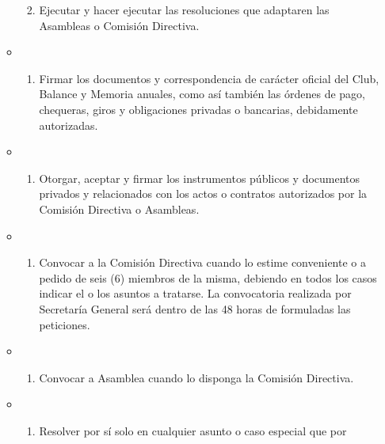 \documentclass[]{book}
\providecommand{\tightlist}{%
  \setlength{\itemsep}{0pt}\setlength{\parskip}{0pt}}
\begin{document}
\begin{itemize}
\begin{itemize}
    \begin{enumerate}
    \def\labelenumi{\alph{enumi})}
    \setcounter{enumi}{4}
    \tightlist
    \item
      Ejecutar y hacer ejecutar las resoluciones que adaptaren las
      Asambleas o Comisión Directiva.
    \end{enumerate}
  \item
    \begin{enumerate}
    \def\labelenumi{\alph{enumi})}
    \setcounter{enumi}{5}
    \tightlist
    \item
      Firmar los documentos y correspondencia de carácter oficial del
      Club, Balance y Memoria anuales, como así también las órdenes de
      pago, chequeras, giros y obligaciones privadas o bancarias,
      debidamente autorizadas.
    \end{enumerate}
  \item
    \begin{enumerate}
    \def\labelenumi{\alph{enumi})}
    \setcounter{enumi}{6}
    \tightlist
    \item
      Otorgar, aceptar y firmar los instrumentos públicos y documentos
      privados y relacionados con los actos o contratos autorizados por
      la Comisión Directiva o Asambleas.
    \end{enumerate}
  \item
    \begin{enumerate}
    \def\labelenumi{\alph{enumi})}
    \setcounter{enumi}{7}
    \tightlist
    \item
      Convocar a la Comisión Directiva cuando lo estime conveniente o a
      pedido de seis (6) miembros de la misma, debiendo en todos los
      casos indicar el o los asuntos a tratarse. La convocatoria
      realizada por Secretaría General será dentro de las 48 horas de
      formuladas las peticiones.
    \end{enumerate}
  \item
    \begin{enumerate}
    \def\labelenumi{\roman{enumi})}
    \tightlist
    \item
      Convocar a Asamblea cuando lo disponga la Comisión Directiva.
    \end{enumerate}
  \item
    \begin{enumerate}
    \def\labelenumi{\alph{enumi})}
    \setcounter{enumi}{9}
    \tightlist
    \item
      Resolver por sí solo en cualquier asunto o caso especial que por

\end{enumerate}
\end{itemize}
\end{itemize}
\end{document}
